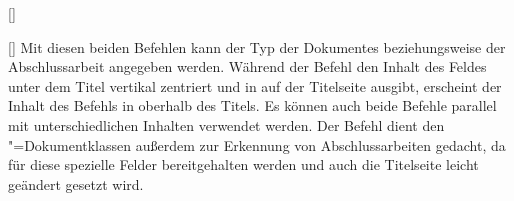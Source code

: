 \begin{Declaration*}{}
\begin{Declaration*}{}
\begin{Declaration*}{}
\begin{Declaration}{[]}
\begin{Declaration}{[]}
\printdeclarationlist%
%
%
%
Mit diesen beiden Befehlen kann der Typ der Dokumentes beziehungsweise der 
Abschlussarbeit angegeben werden. Während der Befehl  den Inhalt 
des Feldes unter dem Titel vertikal zentriert und in \DIN auf der Titelseite 
ausgibt, erscheint der Inhalt des Befehls  in \Univers oberhalb 
des Titels. Es können auch beide Befehle parallel mit unterschiedlichen 
Inhalten verwendet werden. Der Befehl  dient den 
\TUDScript"=Dokumentklassen außerdem zur Erkennung von Abschlussarbeiten 
gedacht, da für diese spezielle Felder bereitgehalten werden und auch die 
Titelseite leicht geändert gesetzt wird.


\end{Declaration}
\end{Declaration}
\end{Declaration*}
\end{Declaration*}
\end{Declaration*}
